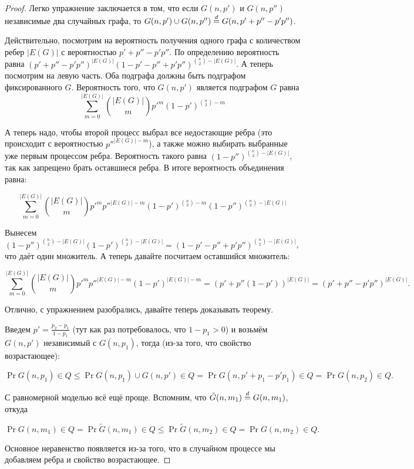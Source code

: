 \begin{proof}
  Легко упражнение заключается в том, что если $G(n, p')$ и $G(n, p'')$ независимые
  два случайных графа, то $G(n, p') \cup G(n, p'') \overset{d}{=}
  G(n, p' + p'' - p'p'')$. 

  Действительно, посмотрим на вероятность получения одного графа с количеством
  ребер $|E(G)|$ с вероятностью $p' + p'' - p'p''$. По определению вероятность равна
  $(p' + p'' - p'p'')^{|E(G)|}(1 - p' - p'' + p'p'')^{\binom{n}{2} - |E(G)|}$. А теперь
  посмотрим на левую часть. Оба подграфа должны быть подграфом фиксированного $G$.
  Вероятность того, что $G(n, p')$ является подграфом $G$ равна
  \[
    \sum\limits_{m = 0}^{|E(G)|} \binom{|E(G)|}{m}p'^m(1 - p')^{\binom{n}{2} - m}
  \]

  А теперь надо, чтобы второй процесс выбрал все недостающие ребра (это происходит
  с вероятностью $p''^{|E(G)| - m}$), а также можно выбирать выбранные уже первым процессом
  ребра. Вероятность такого равна $(1 - p'')^{\binom{n}{2} - |E(G)|}$, так как запрещено
  брать оставшиеся ребра. В итоге вероятность объединения равна:

  \[
    \sum\limits_{m = 0}^{|E(G)|} \binom{|E(G)|}{m}p'^mp''^{|E(G)| - m}(1 -
    p')^{\binom{n}{2} - m}(1 - p'')^{\binom{n}{2} - |E(G)|}
  \]

  Вынесем $(1 - p'')^{\binom{n}{2} - |E(G)|} (1 - p')^{\binom{n}{2} - |E(G)|} =
  (1 - p' - p'' + p'p'')^{\binom{n}{2} - |E(G)|}$, что даёт один множитель. А теперь
  давайте посчитаем оставшийся множитель:

  \[
    \sum\limits_{m = 0}^{|E(G)|} \binom{|E(G)|}{m}p'^mp''^{|E(G)| - m}(1 -
    p')^{|E(G)| - m} = (p' + p''(1 - p'))^{|E(G)|} = (p' + p'' - p'p'')^{|E(G)|}.
  \]

  Отлично, с упражнением разобрались, давайте теперь доказывать теорему.

  Введем $p' = \frac{p_2 - p_1}{1 - p_1}$ (тут как раз потребовалось, что
  $1 - p_1 > 0$) и возьмём $G(n, p')$ независимый с
  $G(n, p_1)$, тогда (из-за того, что свойство возрастающее):

  \[
    \Pr{G(n, p_1) \in Q} \leq \Pr{G(n, p_1) \cup G(n, p') \in Q} = \Pr{G(n, p' + p_1 - p'p_1) \in Q} =
    \Pr{G(n, p_2) \in Q}.
  \]

  С равномерной моделью всё ещё проще. Вспомним, что $\tilde{G}(n, m_1) \overset{d}{=}
  G(n, m_1)$, откуда

  \[
    \Pr{G(n, m_1) \in Q} = \Pr{\tilde{G}(n, m_1) \in Q} \leq \Pr{\tilde{G}(n, m_2) \in Q}
    = \Pr{G(n, m_2) \in Q}.
  \]

  Основное неравенство появляется из-за того, что в случайном процессе мы добавляем
  ребра и свойство возрастающее.
\end{proof}

